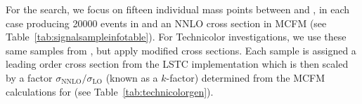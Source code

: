 For the \wprime search, we focus on fifteen individual mass points between  and , in each case producing \num{20000} events in \PYTHIA and an NNLO cross section in MCFM
(see Table~\ref{tab:signalsampleinfotable}).  
For Technicolor investigations, we use these same \wprime samples from \PYTHIA, but apply modified cross sections.  Each sample is assigned a leading order cross section from the \PYTHIA LSTC implementation which is then scaled by a factor $\sigma_\text{NNLO}/\sigma_\text{LO}$ (known as a $k$-factor) determined from the MCFM calculations for \wprime (see Table~\ref{tab:technicolorgen}).




